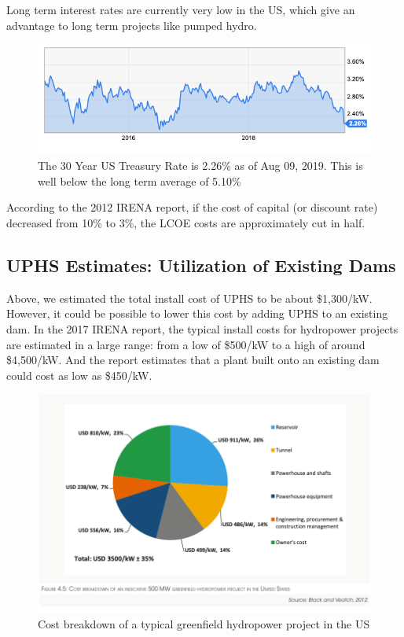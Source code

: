 \documentclass[hidelinks,12pt,a4paper]{article}
\begin{document}
Long term interest rates are currently very low in the US, which give an advantage to long term projects like pumped hydro.

\begin{figure}[ht!]
    \centering
    \includegraphics[width=1\textwidth]{30-year-treasury-rate-226-for-aug-09-2019.png}
    \caption{The 30 Year US Treasury Rate is 2.26\% as of Aug 09, 2019. This is well below the long term average of 5.10\% \cite{30YearTreasuryRateUS}}
\end{figure}
\FloatBarrier

According to the 2012 IRENA report, if the cost of capital (or discount rate) decreased from 10\% to 3\%, the LCOE costs are approximately cut in half. \cite{RenewableEnergyTechnologiesCostAnalysisSeries}

\subsection{UPHS Estimates: Utilization of Existing Dams}
Above, we estimated the total install cost of UPHS to be about \$1,300/kW. However, it could be possible to lower this cost by adding UPHS to an existing dam. In the 2017 IRENA report, the typical install costs for hydropower projects are estimated in a large range: from a low of \$500/kW to a high of around \$4,500/kW. And the report estimates that a plant built onto an existing dam could cost as low as \$450/kW.

\begin{figure}[ht!]
    \centering
    \includegraphics[width=1\textwidth]{cost-breakdown-of-typical-hydro-plant.png}
    \caption{Cost breakdown of a typical greenfield hydropower project in the US \cite{RenewableEnergyTechnologiesCostAnalysisSeries}}
\end{figure}
\FloatBarrier
\end{document}
